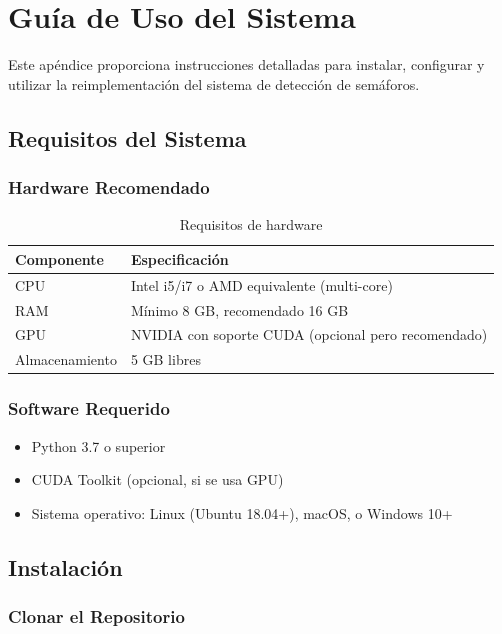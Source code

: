 \chapter{Guía de Uso del Sistema}
\label{apendice:guia_uso}

Este apéndice proporciona instrucciones detalladas para instalar, configurar y utilizar la reimplementación del sistema de detección de semáforos.

\section{Requisitos del Sistema}

\subsection{Hardware Recomendado}

\begin{table}[H]
\centering
\begin{tabular}{|l|l|}
\hline
\textbf{Componente} & \textbf{Especificación} \\
\hline
CPU & Intel i5/i7 o AMD equivalente (multi-core) \\
RAM & Mínimo 8 GB, recomendado 16 GB \\
GPU & NVIDIA con soporte CUDA (opcional pero recomendado) \\
Almacenamiento & 5 GB libres \\
\hline
\end{tabular}
\caption{Requisitos de hardware}
\end{table}

\subsection{Software Requerido}

\begin{itemize}
    \item Python 3.7 o superior
    \item CUDA Toolkit (opcional, si se usa GPU)
    \item Sistema operativo: Linux (Ubuntu 18.04+), macOS, o Windows 10+
\end{itemize}

\section{Instalación}

\subsection{Clonar el Repositorio}

